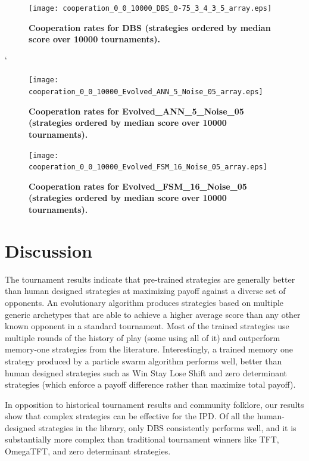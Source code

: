 \documentclass[10pt,letterpaper]{article}
\begin{document}
\begin{figure}[!hbtp]
        \centering
        \texttt{[image: cooperation\_0\_0\_10000\_DBS\_0-75\_3\_4\_3\_5\_array.eps]}
        \caption{\bf Cooperation rates for DBS
            (strategies ordered by median score over 10000 tournaments).}
        \label{fig:comparison_cooperation_heatmaps_noisy_1}
\end{figure}
        `
\begin{figure}[!hbtp]
        \centering
        \texttt{[image: cooperation\_0\_0\_10000\_Evolved\_ANN\_5\_Noise\_05\_array.eps]}
        \caption{\bf Cooperation rates for Evolved\_ANN\_5\_Noise\_05
            (strategies ordered by median score over 10000 tournaments).}
        \label{fig:comparison_cooperation_heatmaps_noisy_2}
\end{figure}

\begin{figure}[!hbtp]
        \centering
        \texttt{[image: cooperation\_0\_0\_10000\_Evolved\_FSM\_16\_Noise\_05\_array.eps]}
        \caption{\bf Cooperation rates for Evolved\_FSM\_16\_Noise\_05
            (strategies ordered by median score over 10000 tournaments).}
        \label{fig:comparison_cooperation_heatmaps_noisy_3}
\end{figure}



\section*{Discussion}

The tournament results indicate that pre-trained strategies are generally better
than human designed strategies at maximizing payoff against a diverse set of
opponents. An evolutionary algorithm produces strategies based on multiple
generic archetypes that are able to achieve a higher average
score than any other known opponent in a standard tournament. Most of the trained
strategies use multiple rounds of the history of play (some using all of it) and
outperform memory-one strategies from the literature. Interestingly, a trained
memory one strategy produced by a particle swarm algorithm performs well, better
than human designed strategies such as Win Stay Lose Shift and zero determinant
strategies (which enforce a payoff difference rather than maximize total payoff).

In opposition to historical tournament results and community folklore,
our results show that complex strategies can be effective for the
IPD\@. Of all the human-designed
strategies in the library, only DBS consistently performs well, and it is
substantially more complex than traditional tournament winners like TFT, OmegaTFT,
and zero determinant strategies.
\end{document}
